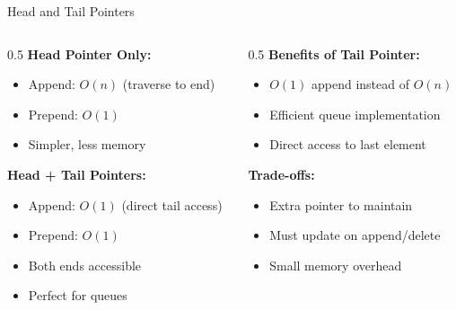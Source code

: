 \documentclass[aspectratio=169,xcolor=dvipsnames]{beamer}
\begin{document}
\begin{frame}{Head and Tail Pointers}
  \begin{columns}
    \begin{column}{0.5\textwidth}
      \textbf{Head Pointer Only:}
      \begin{itemize}
        \item Append: $O(n)$ (traverse to end)
        \item Prepend: $O(1)$
        \item Simpler, less memory
      \end{itemize}

      \vspace{0.3cm}
      \textbf{Head + Tail Pointers:}
      \begin{itemize}
        \item Append: $O(1)$ (direct tail access)
        \item Prepend: $O(1)$
        \item Both ends accessible
        \item Perfect for queues
      \end{itemize}
    \end{column}

    \begin{column}{0.5\textwidth}
      \textbf{Benefits of Tail Pointer:}
      \begin{itemize}
        \item \checkmark $O(1)$ append instead of $O(n)$
        \item \checkmark Efficient queue implementation
        \item \checkmark Direct access to last element
      \end{itemize}

      \vspace{0.3cm}
      \textbf{Trade-offs:}
      \begin{itemize}
        \item Extra pointer to maintain
        \item Must update on append/delete
        \item Small memory overhead
      \end{itemize}
    \end{column}
  \end{columns}
\end{frame}
\end{document}
